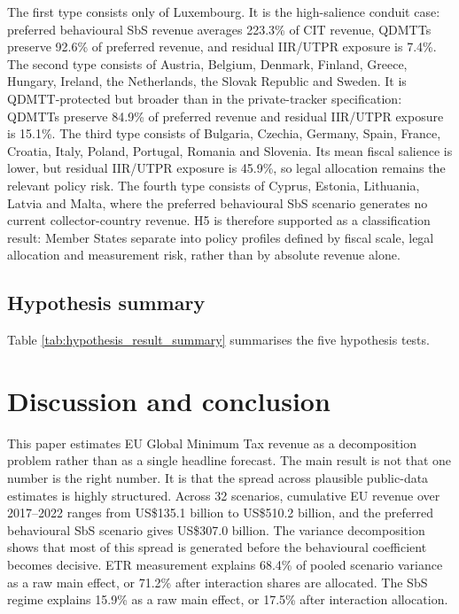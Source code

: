 \documentclass[11pt,a4paper]{article}
\begin{document}
The first type consists only of Luxembourg. It is the high-salience conduit case: preferred behavioural SbS revenue averages 223.3\% of CIT revenue, QDMTTs preserve 92.6\% of preferred revenue, and residual IIR/UTPR exposure is 7.4\%. The second type consists of Austria, Belgium, Denmark, Finland, Greece, Hungary, Ireland, the Netherlands, the Slovak Republic and Sweden. It is QDMTT-protected but broader than in the private-tracker specification: QDMTTs preserve 84.9\% of preferred revenue and residual IIR/UTPR exposure is 15.1\%. The third type consists of Bulgaria, Czechia, Germany, Spain, France, Croatia, Italy, Poland, Portugal, Romania and Slovenia. Its mean fiscal salience is lower, but residual IIR/UTPR exposure is 45.9\%, so legal allocation remains the relevant policy risk. The fourth type consists of Cyprus, Estonia, Lithuania, Latvia and Malta, where the preferred behavioural SbS scenario generates no current collector-country revenue. H5 is therefore supported as a classification result: Member States separate into policy profiles defined by fiscal scale, legal allocation and measurement risk, rather than by absolute revenue alone.

\subsection{Hypothesis summary}\label{sec:results_hypotheses}



Table \ref{tab:hypothesis_result_summary} summarises the five hypothesis tests. 


\section{Discussion and conclusion}\label{sec:discussion}\label{sec:limitations}

This paper estimates EU Global Minimum Tax revenue as a decomposition problem rather than as a single headline forecast. The main result is not that one number is the right number. It is that the spread across plausible public-data estimates is highly structured. Across 32 scenarios, cumulative EU revenue over 2017--2022 ranges from US\$135.1 billion to US\$510.2 billion, and the preferred behavioural SbS scenario gives US\$307.0 billion. The variance decomposition shows that most of this spread is generated before the behavioural coefficient becomes decisive. ETR measurement explains 68.4\% of pooled scenario variance as a raw main effect, or 71.2\% after interaction shares are allocated. The SbS regime explains 15.9\% as a raw main effect, or 17.5\% after interaction allocation.
\end{document}
